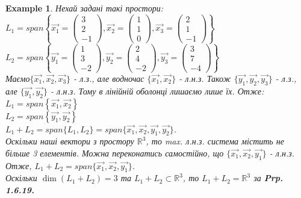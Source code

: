 \documentclass[a4paper, 10pt]{article}
\theoremstyle{theoremdd}
\newtheorem{example}[theorem]{Example}
\begin{document}
	\begin{example}
	Нехай задані такі простори: \\ 
	$L_1 = span\left\{ \vec{x_1} = \begin{pmatrix} 3 \\ 2 \\ -1 \end{pmatrix}, \vec{x_2} = \begin{pmatrix} 1 \\ 1 \\ 0 \end{pmatrix}, \vec{x_3} = \begin{pmatrix} 2 \\ 1 \\ -1 \end{pmatrix}	 \right\}$\\
	$L_2 = span\left\{ \vec{y_1} = \begin{pmatrix} 1 \\ 3 \\ -2 \end{pmatrix}, \vec{y_2} = \begin{pmatrix} 2 \\ 4 \\ -2 \end{pmatrix}, \vec{y_3} = \begin{pmatrix} 3 \\ 7 \\ -4 \end{pmatrix}	 \right\}$\\
	Маємо$\{\vec{x_1}, \vec{x_2}, \vec{x_3}\}$ - л.з., але водночас $\{\vec{x_1},\vec{x_2}\}$ - л.н.з. Також $\{\vec{y_1},\vec{y_2},\vec{y_3}\}$ - л.з., але $\{\vec{y_1},\vec{y_2}\}$ - л.н.з. Тому в лінійній оболонці лишаємо лише їх. Отже: \\
	$L_1 = span\left\{ \vec{x_1}, \vec{x_2} \right\}$\\
	$L_2 = span\left\{ \vec{y_1}, \vec{y_2} \right\}$
	\bigskip \\
	$L_1 + L_2 = span\{L_1, L_2\} = span\{\vec{x_1}, \vec{x_2}, \vec{y_1}, \vec{y_2}\}$.\\
	Оскільки наші вектори з простору $\mathbb{R}^3$, то max. л.н.з. система містить не більше 3 елементів. Можна переконатись самостійно, що $\{\vec{x_1}, \vec{x_2}, \vec{y_1}\}$ - л.н.з. Отже, $L_1 + L_2 = span\{\vec{x_1}, \vec{x_2}, \vec{y_1} \}$.\\
	Оскільки $\dim (L_1 + L_2) = 3$ та $L_1 + L_2 \subset \mathbb{R}^3$, то $L_1+L_2= \mathbb{R}^3$ за \textbf{Prp. 1.6.19.}
	\bigskip \\

\end{example}
\end{document}
